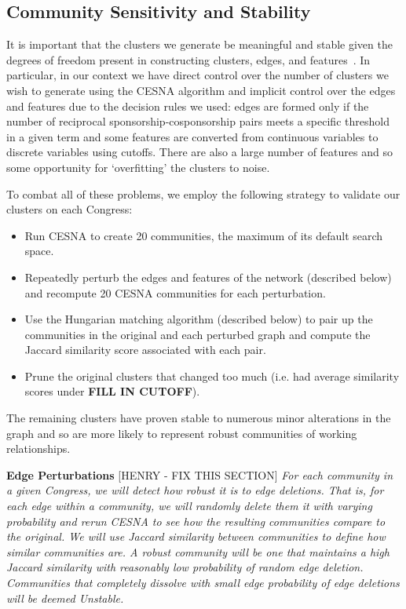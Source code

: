 \subsection{Community Sensitivity and Stability}

It is important that the clusters we generate be meaningful and stable given the
degrees of freedom present in constructing clusters, edges, and
features~\cite{Tzerpos}. In particular, in our context we have direct control
over the number of clusters we wish to generate using the CESNA algorithm and
implicit control over the edges and features due to the decision rules we used:
edges are formed only if the number of reciprocal sponsorship-cosponsorship
pairs meets a specific threshold in a given term and some features are converted
from continuous variables to discrete variables using cutoffs. There are also a
large number of features and so some opportunity for `overfitting' the clusters
to noise.

To combat all of these problems, we employ the following strategy to validate our clusters on each Congress:
\begin{itemize}
	\item Run CESNA to create 20 communities, the maximum of its default search space.
	\item Repeatedly perturb the edges and features of the network (described below) and recompute 20 CESNA communities for each perturbation.
	\item Use the Hungarian matching algorithm (described below) to pair up the communities in the original and each perturbed graph and compute the Jaccard similarity score associated with each pair.
	\item Prune the original clusters that changed too much (i.e. had average similarity scores under \textbf{FILL IN CUTOFF}).
\end{itemize}

The remaining clusters have proven stable to numerous minor alterations in the
graph and so are more likely to represent robust communities of working
relationships.

\textbf{Edge Perturbations}
[HENRY - FIX THIS SECTION]
\textit{For each community in a given Congress, we will detect how robust it is to edge 
deletions. That is, for each edge within a community, we will randomly delete 
them it with varying probability and rerun CESNA to see how the resulting 
communities compare to the original. We will use Jaccard similarity between 
communities to define how similar communities are. A robust community will be 
one that maintains a high Jaccard similarity with reasonably low probability of 
random edge deletion. Communities that completely dissolve with small edge 
probability of edge deletions will be deemed Unstable.}

